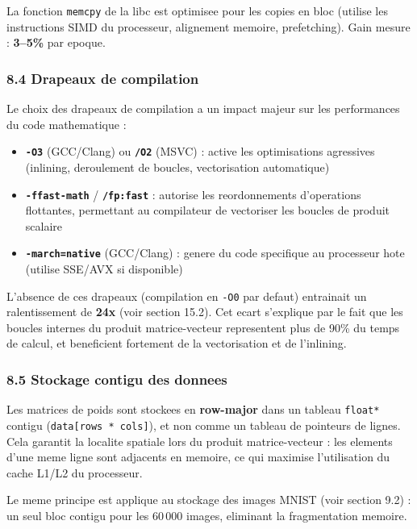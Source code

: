 \documentclass[
  letterpaper,
  DIV=11,
  numbers=noendperiod]{scrartcl}
\providecommand{\tightlist}{%
  \setlength{\itemsep}{0pt}\setlength{\parskip}{0pt}}
\begin{document}
La fonction \texttt{memcpy} de la libc est optimisee pour les copies en bloc (utilise les instructions SIMD du processeur, alignement memoire, prefetching). Gain mesure : \textbf{3--5\%} par epoque.

\subsubsection{8.4 Drapeaux de compilation}\label{drapeaux-compilation}

Le choix des drapeaux de compilation a un impact majeur sur les performances du code mathematique :

\begin{itemize}
\tightlist
\item \textbf{\texttt{-O3}} (GCC/Clang) ou \textbf{\texttt{/O2}} (MSVC) : active les optimisations agressives (inlining, deroulement de boucles, vectorisation automatique)
\item \textbf{\texttt{-ffast-math}} / \textbf{\texttt{/fp:fast}} : autorise les reordonnements d'operations flottantes, permettant au compilateur de vectoriser les boucles de produit scalaire
\item \textbf{\texttt{-march=native}} (GCC/Clang) : genere du code specifique au processeur hote (utilise SSE/AVX si disponible)
\end{itemize}

L'absence de ces drapeaux (compilation en \texttt{-O0} par defaut) entrainait un ralentissement de \textbf{24x} (voir section 15.2). Cet ecart s'explique par le fait que les boucles internes du produit matrice-vecteur representent plus de 90\% du temps de calcul, et beneficient fortement de la vectorisation et de l'inlining.

\subsubsection{8.5 Stockage contigu des donnees}\label{stockage-contigu}

Les matrices de poids sont stockees en \textbf{row-major} dans un tableau \texttt{float*} contigu (\texttt{data[rows * cols]}), et non comme un tableau de pointeurs de lignes. Cela garantit la localite spatiale lors du produit matrice-vecteur : les elements d'une meme ligne sont adjacents en memoire, ce qui maximise l'utilisation du cache L1/L2 du processeur.

Le meme principe est applique au stockage des images MNIST (voir section 9.2) : un seul bloc contigu pour les 60\,000 images, eliminant la fragmentation memoire.
\end{document}

